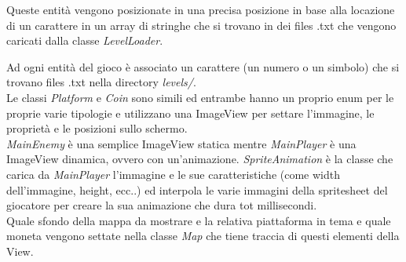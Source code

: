 \textsf{\small Queste entità vengono posizionate in una precisa posizione in base alla locazione di un carattere in un array di stringhe che si trovano in dei files .txt che vengono caricati dalla classe \emph{LevelLoader}.} %

\textsf{\small Ad ogni entità del gioco è associato un carattere (un numero o un simbolo) che si trovano files .txt nella directory \emph{levels/}.}\\ %

\textsf{\small Le classi \emph{Platform} e \emph{Coin} sono simili ed entrambe hanno un proprio enum per le proprie varie tipologie e utilizzano una ImageView per settare l'immagine, le proprietà e le posizioni sullo schermo.}\\

\textsf{\small \emph{MainEnemy} è una semplice ImageView statica mentre \emph{MainPlayer} è una ImageView dinamica, ovvero con un'animazione.}
\textsf{\small \emph{SpriteAnimation} è la classe che carica da \emph{MainPlayer} l'immagine e le sue caratteristiche (come width dell'immagine, height, ecc..) ed interpola le varie immagini della spritesheet del giocatore per creare la sua animazione che dura tot millisecondi.}\\

\textsf{\small  Quale sfondo della mappa da mostrare e la relativa piattaforma in tema e quale moneta vengono settate nella classe \emph{Map} che tiene traccia di questi elementi della View.}\\

